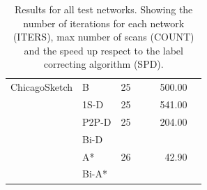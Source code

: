 \begin{table}
\begin{tabular}{l l r rr rr }
        ChicagoSketch & B     & 25 & & & 500.00 & \\
        & 1S-D  & 25 & & & 541.00 & \\
        & P2P-D & 25 & & & 204.00 & \\
        & Bi-D  & & & & & \\
        & A*    & 26 & & & 42.90 & \\
        & Bi-A* & & & & & \\
        \bottomrule
    \end{tabular}
    \caption{Results for all test networks. Showing the number of iterations for each network (ITERS), max number of scans (COUNT) and the speed up respect to the label correcting algorithm (SPD). }
    \label{table:allresults}
\end{table}

